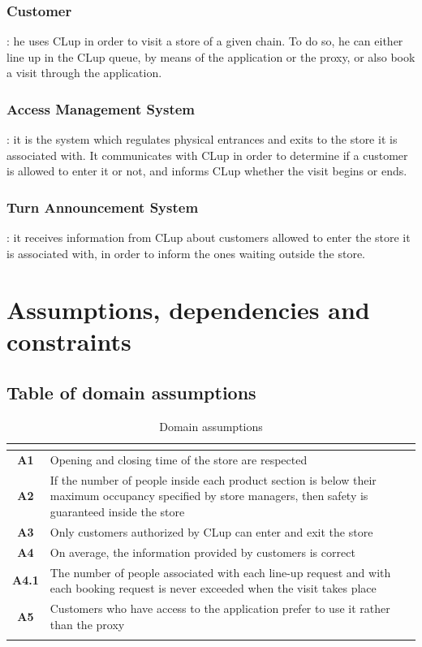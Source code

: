 \documentclass[a4paper,oneside,11pt]{book}   %
\begin{document}
    \subsubsection{Customer}: he uses CLup in order to visit a store of a given chain. To do so, he can either line up in the CLup queue, by means of the application or the proxy, or also book a visit through the application. 
    \subsubsection{Access Management System}: it is the system which regulates physical entrances and exits to the store it is associated with. It communicates with CLup in order to determine if a customer is allowed to enter it or not, and informs CLup whether the visit begins or ends.
    \subsubsection{Turn Announcement System}: it receives information from CLup about customers allowed to enter the store it is associated with, in order to inform the ones waiting outside the store.
    
    \section{Assumptions, dependencies and constraints}
    \subsection{Table of domain assumptions}
    \begin{longtable}[c]{|>{\bfseries{}}c|V{.62\textwidth}|}
        \hline
         \\
        \hline
        A1   & Opening and closing time of the store are respected \\ \hline
        A2   & If the number of people inside each product section is below their maximum occupancy specified by store managers, then safety is guaranteed inside the store \\ \hline
        A3   & Only customers authorized by CLup can enter and exit the store \\ \hline
        A4   & On average, the information provided by customers is correct \\ \hline
        A4.1 & The number of people associated with each line-up request and with each booking request is never exceeded when the visit takes place \\ \hline
        A5   & Customers who have access to the application prefer to use it rather than the proxy \\
        \hline
        \caption{Domain assumptions}
        \label{table:domain_assumptions}
    \end{longtable}
    
\end{document}
